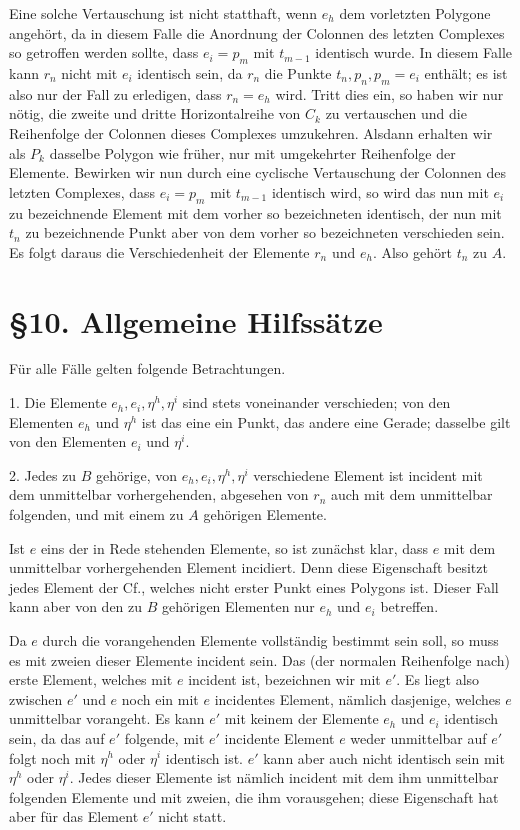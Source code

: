 \documentclass[11pt]{article}
\newcommand{\Cf}{\textup{Cf.}}
\begin{document}
Eine solche Vertauschung ist nicht statthaft, wenn $e_h$ dem vorletzten Polygone angehört, da in diesem Falle die Anordnung der Colonnen des letzten Complexes so getroffen werden sollte, dass $e_i=p_m$ mit $t_{m-1}$ identisch wurde. In diesem Falle kann $r_n$ nicht mit $e_i$ identisch sein, da $r_n$ die Punkte $t_n,p_n,p_m=e_i$ enthält; es ist also nur der Fall zu erledigen, dass $r_n=e_h$ wird. Tritt dies ein, so haben wir nur nötig, die zweite und dritte Horizontalreihe von $C_k$ zu vertauschen und die Reihenfolge der Colonnen dieses Complexes umzukehren. Alsdann erhalten wir als $P_k$ dasselbe Polygon wie früher, nur mit umgekehrter Reihenfolge der Elemente. Bewirken wir nun durch eine cyclische Vertauschung der Colonnen des letzten Complexes, dass $e_i=p_m$ mit $t_{m-1}$ identisch wird, so wird das nun mit $e_i$ zu bezeichnende Element mit dem vorher so bezeichneten identisch, der nun mit $t_n$ zu bezeichnende Punkt aber von dem vorher so bezeichneten verschieden sein. Es folgt daraus die Verschiedenheit der Elemente $r_n$ und $e_h$. Also gehört $t_n$ zu $A$.

\section*{\S 10. Allgemeine Hilfssätze}
Für alle Fälle gelten folgende Betrachtungen.

1. Die Elemente $e_h,e_i,\eta^h,\eta^i$ sind stets voneinander verschieden; von den Elementen $e_h$ und $\eta^h$ ist das eine ein Punkt, das andere eine Gerade; dasselbe gilt von den Elementen $e_i$ und $\eta^i$.

2. Jedes zu $B$ gehörige, von $e_h,e_i,\eta^h,\eta^i$ verschiedene Element ist incident mit dem unmittelbar vorhergehenden, abgesehen von $r_n$ auch mit dem unmittelbar folgenden, und mit einem zu $A$ gehörigen Elemente.

Ist $e$ eins der in Rede stehenden Elemente, so ist zunächst klar, dass $e$ mit dem unmittelbar vorhergehenden Element incidiert. Denn diese Eigenschaft besitzt jedes Element der \Cf, welches nicht erster Punkt eines Polygons ist. Dieser Fall kann aber von den zu $B$ gehörigen Elementen nur $e_h$ und $e_i$ betreffen.

Da $e$ durch die vorangehenden Elemente vollständig bestimmt sein soll, so muss es mit zweien dieser Elemente incident sein. Das (der normalen Reihenfolge nach) erste Element, welches mit $e$ incident ist, bezeichnen wir mit $e'$. Es liegt also zwischen $e'$ und $e$ noch ein mit $e$ incidentes Element, nämlich dasjenige, welches $e$ unmittelbar vorangeht. Es kann $e'$ mit keinem der Elemente $e_h$ und $e_i$ identisch sein, da das auf $e'$ folgende, mit $e'$ incidente Element $e$ weder unmittelbar auf $e'$ folgt noch mit $\eta^h$ oder $\eta^i$ identisch ist. $e'$ kann aber auch nicht identisch sein mit $\eta^h$ oder $\eta^i$. Jedes dieser Elemente ist nämlich incident mit dem ihm unmittelbar folgenden Elemente und mit zweien, die ihm vorausgehen; diese Eigenschaft hat aber für das Element $e'$ nicht statt.
\end{document}
